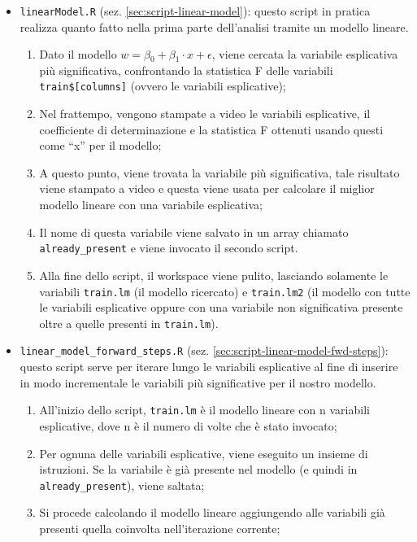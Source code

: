 \begin{itemize}
\item \texttt{linearModel.R} (sez. \ref{sec:script-linear-model}): questo
  script in pratica realizza quanto fatto nella prima parte dell'analisi
  tramite un modello lineare.
  \begin{enumerate}
  \item Dato il modello $ w = \beta{}_0 + \beta{}_1 \cdot{} x + \epsilon{} $,
  viene cercata la variabile esplicativa più significativa, confrontando la
  statistica F delle variabili \texttt{train\$[columns]} (ovvero le variabili
  esplicative);
  \item Nel frattempo, vengono stampate a video le variabili esplicative, il
  coefficiente di determinazione e la statistica F ottenuti usando questi come
  ``x'' per il modello;
  \item A questo punto, viene trovata la variabile più significativa, tale
  risultato viene stampato a video e questa viene usata per calcolare il
  miglior modello lineare con una variabile esplicativa;
  \item Il nome di questa variabile viene salvato in un array chiamato
  \texttt{already\_present} e viene invocato il secondo script.
  \item Alla fine dello script, il workspace viene pulito, lasciando solamente
  le variabili \texttt{train.lm} (il modello ricercato) e \texttt{train.lm2}
  (il modello con tutte le variabili esplicative oppure con una variabile non
  significativa presente oltre a quelle presenti in \texttt{train.lm}).
  \end{enumerate}
\item \texttt{linear\_model\_forward\_steps.R} (sez.
  \ref{sec:script-linear-model-fwd-steps}): questo script serve per iterare
  lungo le variabili esplicative al fine di inserire in modo incrementale le
  variabili più significative per il nostro modello.
  \begin{enumerate}
  \item All'inizio dello script, \texttt{train.lm} è il modello lineare con n
    variabili esplicative, dove n è il numero di volte che è stato invocato;
  \item Per ognuna delle variabili esplicative, viene eseguito un insieme di
    istruzioni. Se la variabile è già presente nel modello (e quindi in
    \texttt{already\_present}), viene saltata;
  \item Si procede calcolando il modello lineare aggiungendo alle variabili
    già presenti quella coinvolta nell'iterazione corrente;

\end{enumerate}
\end{itemize}
